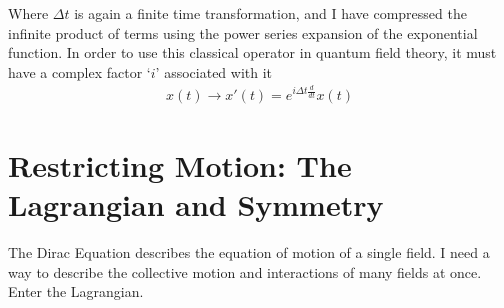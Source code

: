     Where $\Delta t$ is again a finite time transformation,
        and I have compressed the infinite product of terms using the power series expansion of the exponential function.
    In order to use this classical operator in quantum field theory, it must have a complex factor `$i$' associated with it
    \begin{equation} \begin{split}
    x(t) \rightarrow x'(t) = e^{i\Delta t \frac{d}{dt}} x(t)
    \end{split} \end{equation}



     




    \cite{Cheng_book}

\section{Restricting Motion: The Lagrangian and Symmetry}
    
    The Dirac Equation describes the equation of motion of a single field.
    I need a way to describe the collective motion and interactions of many fields at once.
    Enter the Lagrangian.

    


